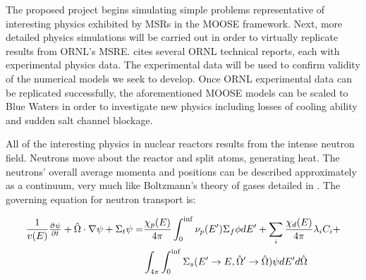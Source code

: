 The proposed project begins simulating simple problems representative of interesting physics exhibited by MSRs in the MOOSE framework. Next, more detailed physics simulations will be carried out in order to virtually replicate results from ORNL's MSRE. \cite{robertson_msre} cites several ORNL technical reports, each with experimental physics data. The experimental data will be used to confirm validity of the numerical models we seek to develop. Once ORNL experimental data can be replicated successfully, the aforementioned MOOSE models can be scaled to Blue Waters in order to investigate new physics including losses of cooling ability and sudden salt channel blockage.

All of the interesting physics in nuclear reactors results from the intense neutron field. Neutrons move about the reactor and split atoms, generating heat. The neutrons' overall average momenta and positions can be described approximately as a continuum, very much like Boltzmann's theory of gases detailed in \cite{boltzmann_lectures_2011}. The governing equation for neutron transport is:

\begin{equation}
      \begin{aligned}
          \frac{1}{v(E)} \pd{\psi}{t} + \hat{\Omega}\cdot \nabla \psi + {\Sigma_t} \psi =&
          \frac{\chi_p(E)}{4 \pi} \int_{0}^{\inf} \nu_p(E') {\Sigma_f} {\phi} dE' + 
          \sum_i \frac{\chi_d(E)}{4 \pi} \lambda _i C_i + \\
          & \int_{4\pi}  \int_{0}^{\inf} {\Sigma_s(E'\rightarrow E,\hat{\Omega}'\rightarrow \hat{\Omega})} \psi dE' d\hat{\Omega}\\
      \end{aligned}
\label{eq:nte}
\end{equation}


